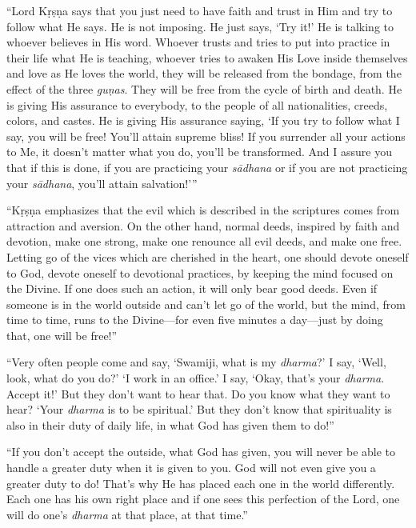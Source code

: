 \enquote{Lord Kṛṣṇa says that you just need to have faith and trust in Him and try to follow what He says. He is not imposing. He just says, \enquote{Try it!} He is talking to whoever believes in His word. Whoever trusts and tries to put into practice in their life what He is teaching, whoever tries to awaken His Love inside themselves and love as He loves the world, they will be released from the bondage, from the effect of the three \textit{guṇas}. They will be free from the cycle of birth and death. He is giving His assurance to everybody, to the people of all nationalities, creeds, colors, and castes. He is giving His assurance saying, \enquote{If you try to follow what I say, you will be free! You’ll attain supreme bliss! If you surrender all your actions to Me, it doesn’t matter what you do, you’ll be transformed. And I assure you that if this is done, if you are practicing your \textit{sādhana} or if you are not practicing your \textit{sādhana}, you’ll attain salvation!}}

\enquote{Kṛṣṇa emphasizes that the evil which is described in the scriptures comes from attraction and aversion. On the other hand, normal deeds, inspired by faith and devotion, make one strong, make one renounce all evil deeds, and make one free. Letting go of the vices which are cherished in the heart, one should devote oneself to God, devote oneself to devotional practices, by keeping the mind focused on the Divine. If one does such an action, it will only bear good deeds. Even if someone is in the world outside and can’t let go of the world, but the mind, from time to time, runs to the Divine---for even five minutes a day---just by doing that, one will be free!}

\enquote{Very often people come and say, \enquote{Swamiji, what is my \textit{dharma}?} I say, \enquote{Well, look, what do you do?} \enquote{I work in an office.} I say, \enquote{Okay, that’s your \textit{dharma}. Accept it!} But they don’t want to hear that. Do you know what they want to hear? \enquote{Your \textit{dharma} is to be spiritual.} But they don’t know that spirituality is also in their duty of daily life, in what God has given them to do!}

\enquote{If you don’t accept the outside, what God has given, you will never be able to handle a greater duty when it is given to you. God will not even give you a greater duty to do! That’s why He has placed each one in the world differently. Each one has his own right place and if one sees this perfection of the Lord, one will do one’s \textit{dharma} at that place, at that time.}

